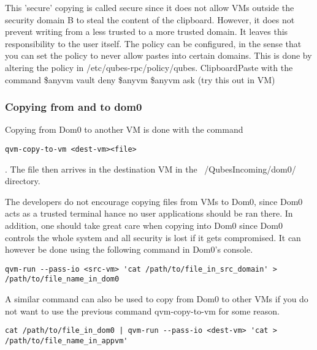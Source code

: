 \documentclass[runningheads,a4paper]{article}
\begin{document}
 This 'secure' copying is called secure since it does not allow VMs
outside the security domain B to steal the content of the clipboard.
However, it does not prevent writing from a less trusted to a more
trusted domain.  It leaves this responsibility to the user itself.
The policy can be configured, in the sense that you can set the policy
to never allow pastes into certain domains.  This is done by altering
the policy in /etc/qubes-rpc/policy/qubes. ClipboardPaste with the
command \$anyvm vault deny \$anyvm \$anyvm ask (try this out in VM)

\subsubsection{Copying from and to dom0} 

Copying from Dom0 to another
VM is done with the command
\begin{verbatim}
qvm-copy-to-vm <dest-vm><file>
\end{verbatim}.
The file then arrives in the destination VM in the
~/QubesIncoming/dom0/ directory.

The developers do not encourage copying files from VMs to Dom0, since
Dom0 acts as a trusted terminal hance no user applications should be
ran there.  In addition, one should take great care when copying into
Dom0 since Dom0 controls the whole system and all security is lost if
it gets compromised.  It can however be done using the following
command in Dom0's console.  
\begin{verbatim}
qvm-run --pass-io <src-vm> 'cat /path/to/file_in_src_domain' > /path/to/file_name_in_dom0 
\end{verbatim} 
 A similar command can also be used to copy from Dom0 to other VMs if
you do not want to use the previous command qvm-copy-to-vm for some
reason.  
\begin{verbatim}
cat /path/to/file_in_dom0 | qvm-run --pass-io <dest-vm> 'cat > /path/to/file_name_in_appvm'
\end{verbatim}
\end{document}
